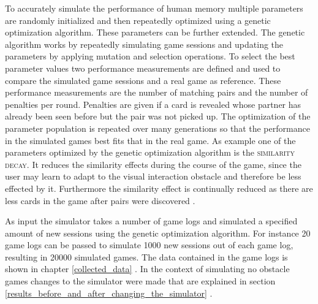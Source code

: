 To accurately simulate the performance of human memory multiple parameters are randomly initialized and then repeatedly optimized using a genetic optimization algorithm. These parameters can be further extended. The genetic algorithm works by repeatedly simulating game sessions and updating the parameters by applying mutation and selection operations. To select the best parameter values two performance measurements are defined and used to compare the simulated game sessions and a real game as reference. These performance measurements are the number of matching pairs and the number of penalties per round. Penalties are given if a card is revealed whose partner has already been seen before but the pair was not picked up. The optimization of the parameter population is repeated over many generations so that the performance in the simulated games best fits that in the real game. As example one of the parameters optimized by the genetic optimization algorithm is the \textsc{similarity decay}. It reduces the similarity effects during the course of the game, since the user may learn to adapt to the visual interaction obstacle and therefore be less effected by it. Furthermore the similarity effect is continually reduced as there are less cards in the game after pairs were discovered \cite{blind}.

As input the simulator takes a number of game logs and simulated a specified amount of new sessions using the genetic optimization algorithm. For instance 20 game logs can be passed to simulate 1000 new sessions out of each game log, resulting in 20000 simulated games. The data contained in the game logs is shown in chapter \ref{collected_data} . In the context of simulating no obstacle games changes to the simulator were made that are explained in section \ref{results_before_and_after_changing_the_simulator} .

